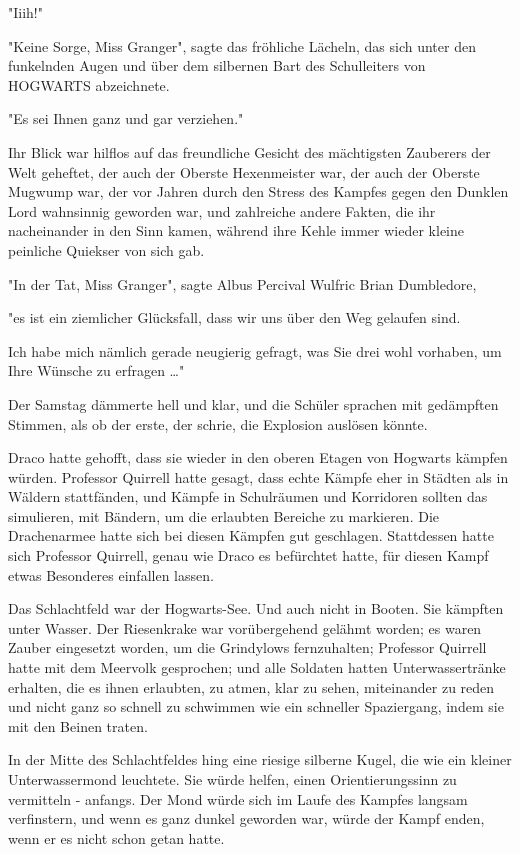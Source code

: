 {"Iiih!"

"Keine Sorge, Miss Granger", sagte das fröhliche Lächeln, das sich unter den funkelnden Augen und über dem silbernen Bart des Schulleiters von HOGWARTS abzeichnete.

"Es sei Ihnen ganz und gar verziehen."

Ihr Blick war hilflos auf das freundliche Gesicht des mächtigsten Zauberers der Welt geheftet, der auch der Oberste Hexenmeister war, der auch der Oberste Mugwump war, der vor Jahren durch den Stress des Kampfes gegen den Dunklen Lord wahnsinnig geworden war, und zahlreiche andere Fakten, die ihr nacheinander in den Sinn kamen, während ihre Kehle immer wieder kleine peinliche Quiekser von sich gab.

"In der Tat, Miss Granger", sagte Albus Percival Wulfric Brian Dumbledore,

"es ist ein ziemlicher Glücksfall, dass wir uns über den Weg gelaufen sind.

Ich habe mich nämlich gerade neugierig gefragt, was Sie drei wohl vorhaben, um Ihre Wünsche zu erfragen …"

Der Samstag dämmerte hell und klar, und die Schüler sprachen mit gedämpften Stimmen, als ob der erste, der schrie, die Explosion auslösen könnte.

Draco hatte gehofft, dass sie wieder in den oberen Etagen von Hogwarts kämpfen würden. Professor Quirrell hatte gesagt, dass echte Kämpfe eher in Städten als in Wäldern stattfänden, und Kämpfe in Schulräumen und Korridoren sollten das simulieren, mit Bändern, um die erlaubten Bereiche zu markieren. Die Drachenarmee hatte sich bei diesen Kämpfen gut geschlagen. Stattdessen hatte sich Professor Quirrell, genau wie Draco es befürchtet hatte, für diesen Kampf etwas Besonderes einfallen lassen.

Das Schlachtfeld war der Hogwarts-See. Und auch nicht in Booten. Sie kämpften unter Wasser. Der Riesenkrake war vorübergehend gelähmt worden; es waren Zauber eingesetzt worden, um die Grindylows fernzuhalten; Professor Quirrell hatte mit dem Meervolk gesprochen; und alle Soldaten hatten Unterwassertränke erhalten, die es ihnen erlaubten, zu atmen, klar zu sehen, miteinander zu reden und nicht ganz so schnell zu schwimmen wie ein schneller Spaziergang, indem sie mit den Beinen traten.

In der Mitte des Schlachtfeldes hing eine riesige silberne Kugel, die wie ein kleiner Unterwassermond leuchtete. Sie würde helfen, einen Orientierungssinn zu vermitteln - anfangs. Der Mond würde sich im Laufe des Kampfes langsam verfinstern, und wenn es ganz dunkel geworden war, würde der Kampf enden, wenn er es nicht schon getan hatte.

}
